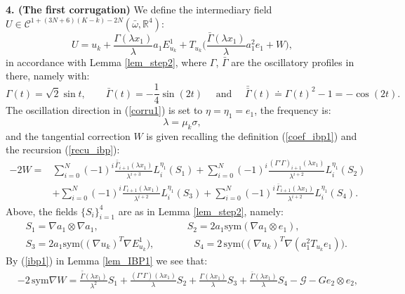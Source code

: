 \documentclass[reqno,twoside,11pt]{amsart}
\newcommand{\sym}{\mathrm{sym}}
\newcommand{\R}{\mathbb{R}}
\newcommand*{\dbar}[1]{\bar{\bar{#1}}}
\numberwithin{equation}{section}
\theoremstyle{plain}
\theoremstyle{definition}
\begin{document}
{\bf 4. (The first corrugation)} We define the intermediary field
$U\in\mathcal{C}^{1+(3N+6)(K-k)-2N}(\bar\omega, \R^4)$:
\begin{equation}\label{corru1}
U=u_k+\frac{\Gamma(\lambda x_1)}{\lambda}a_1E^1_{u_k} +
T_{u_k}\Big(\frac{\bar\Gamma(\lambda x_1)}{\lambda}a_1^2 e_1+ W\Big),
\end{equation}
in accordance with Lemma \ref{lem_step2}, where $\Gamma$, $\bar\Gamma$ are the oscillatory
profiles in there, namely with:
\begin{equation}\label{m11}
\Gamma(t) = \sqrt{2}\sin t ,\qquad\bar\Gamma(t) =
-\frac{1}{4}\sin(2t) \quad\mbox{ and } \quad\dbar\Gamma(t) \doteq\Gamma(t)^2-1= -\cos(2t).
\end{equation}
The oscillation direction in (\ref{corru1}) is set to $\eta=\eta_1=e_1$,  the frequency is:
$$\lambda = \mu_k\sigma,$$ 
and the tangential correction $W$ is given recalling the definition
(\ref{coef_ibp1}) and the recursion (\ref{recu_ibp}):
\begin{equation*}
\begin{split}
-2W = & \sum_{i=0}^N (-1)^i \frac{\dbar\Gamma_{i+1}(\lambda x_1)}{\lambda^{i+3}}L_i^{\eta_1}(S_1) 
+ \sum_{i=0}^N (-1)^i \frac{(\Gamma'\Gamma)_{i+1}(\lambda x_1)}{\lambda^{i+2}}L_i^{\eta_1}(S_2) 
\\ & + \sum_{i=0}^N (-1)^i \frac{\Gamma_{i+1}(\lambda x_1)}{\lambda^{i+2}}L_i^{\eta_1}(S_3) 
+ \sum_{i=0}^N (-1)^i \frac{\bar\Gamma_{i+1}(\lambda x_1)}{\lambda^{i+2}}L_i^{\eta_1}(S_4). 
\end{split}
\end{equation*}
Above, the fields $\{S_i\}_{i=1}^4$ are as in Lemma \ref{lem_step2}, namely:
\begin{equation}\label{S_first}
\begin{split}
& S_1= \nabla a_1\otimes\nabla a_1, \qquad\qquad\qquad \qquad\quad
S_2 = 2a_1\sym(\nabla a_1\otimes e_1),\\
& S_3 = 2a_1\sym\big((\nabla u_k)^T\nabla E^1_{u_k}\big), \qquad\qquad
S_4 =2\,\sym\big((\nabla u_k)^T\nabla (a_1^2 T_{u_k}e_1)\big).
\end{split}
\end{equation}
By (\ref{ibp1}) in Lemma \ref{lem_IBP1} we see that:
\begin{equation}\label{symW}
\begin{split}
& -2\,\sym\nabla W = \frac{\dbar\Gamma(\lambda x_1)}{\lambda^2} S_1 
+ \frac{(\Gamma'\Gamma)(\lambda x_1)}{\lambda} S_2 
+ \frac{\Gamma(\lambda x_1)}{\lambda} S_3+ \frac{\bar\Gamma(\lambda
  x_1)}{\lambda} S_4  - \mathcal{G} - G e_2\otimes e_2,
\end{split}
\end{equation}
\end{document}
